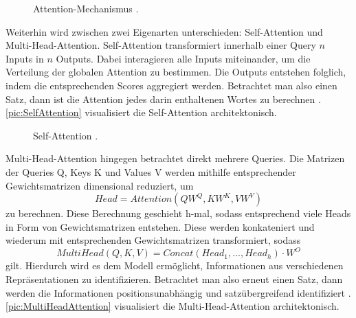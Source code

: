 \begin{figure}[h!]
  \centering
  \caption{Attention-Mechanismus \cite[S.~394]{ZHA20}.}
  \label{pic:AttentionMechanism}
\end{figure}

\noindent
Weiterhin wird zwischen zwei Eigenarten unterschieden: Self-Attention und Multi-Head-Attention. Self-Attention transformiert innerhalb einer Query $n$ Inputs in $n$ Outputs. Dabei interagieren alle Inputs miteinander, um die Verteilung der globalen Attention zu bestimmen. Die Outputs entstehen folglich, indem die entsprechenden Scores aggregiert werden. Betrachtet man also einen Satz, dann ist die Attention jedes darin enthaltenen Wortes zu berechnen \cite{KAR19}. \autoref{pic:SelfAttention} visualisiert die Self-Attention architektonisch.

\begin{figure}[h!]
  \centering
  \caption{Self-Attention \cite[S.~400]{ZHA20}.}
  \label{pic:SelfAttention}
\end{figure}

\noindent
Multi-Head-Attention hingegen betrachtet direkt mehrere Queries. Die Matrizen der Queries Q, Keys K und Values V werden mithilfe entsprechender Gewichtsmatrizen dimensional reduziert, um $$Head = Attention(QW^Q, KW^K, VW^V)$$ zu berechnen. Diese Berechnung geschieht h-mal, sodass entsprechend viele Heads in Form von Gewichtsmatrizen entstehen. Diese werden konkateniert und wiederum mit entsprechenden Gewichtsmatrizen transformiert, sodass $$MultiHead(Q,K,V) = Concat(Head_1, ..., Head_h) \cdot W^O$$ gilt. Hierdurch wird es dem Modell ermöglicht, Informationen aus verschiedenen Repräsentationen zu identifizieren. Betrachtet man also erneut einen Satz, dann werden die Informationen positionsunabhängig und satzübergreifend identifiziert \cite{VAS17}. \autoref{pic:MultiHeadAttention} visualisiert die Multi-Head-Attention architektonisch.
\newpage

